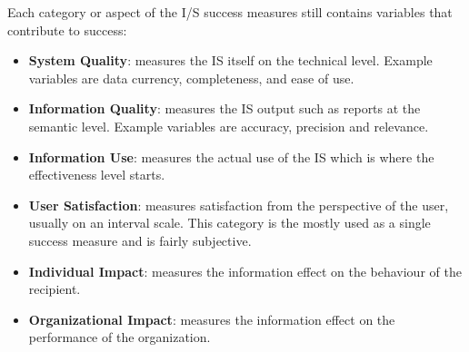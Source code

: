 Each category or aspect of the I/S success measures still contains variables that contribute to success:

\begin{itemize}
\item \textbf{System Quality}: measures the IS itself on the technical level. Example variables are data currency, completeness, and ease of use.
\item \textbf{Information Quality}: measures the IS output such as reports at the semantic level. Example variables are accuracy, precision and relevance.
\item \textbf{Information Use}: measures the actual use of the IS which is where the effectiveness level starts.
\item \textbf{User Satisfaction}: measures satisfaction from the perspective of the user, usually on an interval scale. This category is the mostly used as a single success measure and is fairly subjective.
\item \textbf{Individual Impact}: measures the information effect on the behaviour of the recipient.
\item \textbf{Organizational Impact}: measures the information effect on the performance of the organization.
\end{itemize}
